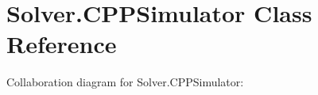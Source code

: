\hypertarget{classSolver_1_1CPPSimulator}{}\section{Solver.\+C\+P\+P\+Simulator Class Reference}
\label{classSolver_1_1CPPSimulator}


Collaboration diagram for Solver.\+C\+P\+P\+Simulator\+:
